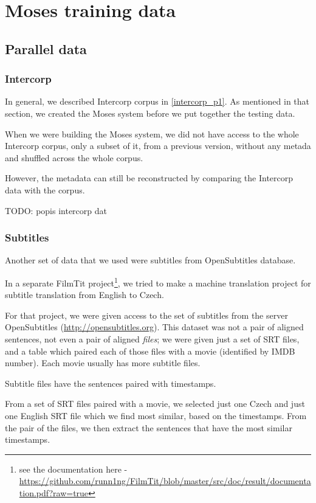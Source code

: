 \section{Moses training data}
\subsection{Parallel data}
\subsubsection{Intercorp}
In general, we described Intercorp corpus in \ref{intercorp_p1}. As mentioned in that section, we created the Moses system before we put together the testing data.

When we were building the Moses system, we did not have access to the whole Intercorp corpus, only a subset of it, from a previous version, without any metada and shuffled across the whole corpus.

However, the metadata can still be reconstructed by comparing the Intercorp data with the corpus.


TODO: popis intercorp dat

\subsubsection{Subtitles}
Another set of data that we used were subtitles from OpenSubtitles database.

In a separate FilmTit project\footnote{see the documentation here - \url{https://github.com/runn1ng/FilmTit/blob/master/src/doc/result/documentation.pdf?raw=true}}, we tried to make a machine translation project for subtitle translation from English to Czech.

For that project, we were given access to the set of subtitles from the server OpenSubtitles (\url{http://opensubtitles.org}). This dataset was not a pair of aligned sentences, not even a pair of aligned \emph{files}; we were given just a set of SRT files, and a table which paired each of those files with a movie (identified by IMDB number). Each movie usually has more subtitle files.

Subtitle files have the sentences paired with timestamps.

From a set of SRT files paired with a movie, we selected just one Czech and just one English SRT file which we find most similar, based on the timestamps.
From the pair of the files, we then extract the sentences that have the most similar timestamps.

